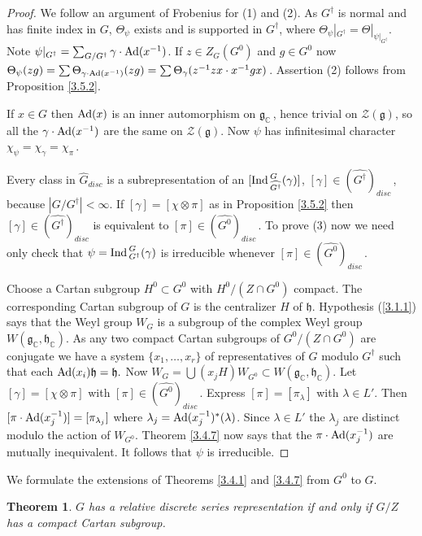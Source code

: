 \documentclass{conm-p-l}
\newtheorem{theorem}[equation]{Theorem}
\renewcommand{\gg}{\mathfrak{g}}
\def\gg{\mathfrak{g}}
\def\gh{\mathfrak{h}}
\def\Ad{{\rm Ad}}
\def\Ind{{\rm Ind\,}}
\def\C{\mathbb{C}}
\def\cZ{\mathcal{Z}}
\begin{document}
\begin{proof}
We follow an argument \cite[Lemma 4.3.3]{W1967} of Frobenius for (1) and (2).
As $G^\dagger$ is normal and has finite index in $G$, $\Theta_\psi$
exists and is supported in $G^\dagger$, where $\Theta_\psi|_{G^\dagger} =
\Theta|_{\psi|_{G^\dagger}}$.  Note $\psi|_{G^\dagger} = 
\sum_{G/G^\dagger} \gamma\cdot\Ad(x^{-1})$.  If $z \in Z_G(G^0)$ and
$g \in G^0$ now $\Theta_\psi(zg) = \sum \Theta_{\gamma\cdot\Ad(x^{-1})}(zg)
= \sum \Theta_\gamma(z^{-1}zx\cdot x^{-1}gx)$\,.  Assertion (2) follows 
from Proposition \ref{3.5.2}.

If $x \in G$ then $\Ad(x)$ is an inner automorphism on $\gg_\C$\,, hence 
trivial on $\cZ(\gg)$, so all the $\gamma\cdot\Ad(x^{-1})$ are the same
on $\cZ(\gg)$.  Now $\psi$ has infinitesimal character $\chi_\psi =
\chi_\gamma = \chi_\pi$\,.

Every class in $\widehat{G}_{disc}$ is a subrepresentation of an 
$[\Ind_{\widehat{G^\dagger}}^G(\gamma)]$, 
$[\gamma] \in (\widehat{G^\dagger})_{disc}$\,, because $|G/G^\dagger| < \infty$.
If $[\gamma] = [\chi\otimes\pi]$ as in Proposition \ref{3.5.2} then
$[\gamma] \in (\widehat{G^\dagger})_{disc}$ is equivalent to
$[\pi] \in (\widehat{G^0})_{disc}$\,.  To prove (3) now we need only
check that $\psi = \Ind_{G^\dagger}^G(\gamma)$ is irreducible whenever
$[\pi] \in (\widehat{G^0})_{disc}$\,.  

Choose a Cartan subgroup
$H^0 \subset G^0$ with $H^0/(Z\cap G^0)$ compact.  The corresponding
Cartan subgroup of $G$ is the centralizer $H$ of $\gh$.  Hypothesis
(\ref{3.1.1}) says that the Weyl group $W_G$ is a subgroup of the complex
Weyl group $W(\gg_\C,\gh_\C)$.  As any two compact Cartan subgroups of
$G^0/(Z\cap G^0)$ are conjugate we have a system $\{x_1,\dots ,x_r\}$
of representatives of $G$ modulo $G^\dagger$ such that each $\Ad(x_i)\gh = \gh.$
Now $W_G = \bigcup (x_jH)W_{G^0} \subset W(\gg_\C,\gh_\C)$.  Let $[\gamma]
= [\chi\otimes\pi]$ with $[\pi] \in (\widehat{G^0})_{disc}$\,.  Express
$[\pi] = [\pi_\lambda]$ with $\lambda \in L'$.  Then $[\pi\cdot\Ad(x_j^{-1})]
= [\pi_{\lambda_j}]$ where $\lambda_j = \Ad(x^{-1}_j)^*(\lambda)$.
Since $\lambda \in L'$ the $\lambda_j$ are distinct modulo the action of
$W_{G^0}$.  Theorem \ref{3.4.7} now says that the $\pi\cdot\Ad(x_j^{-1})$
are mutually inequivalent.  It follows that $\psi$ is irreducible.
\end{proof}

We formulate the extensions of Theorems \ref{3.4.1} and \ref{3.4.7}
from $G^0$ to $G$.
\begin{theorem}\label{3.5.8}
$G$ has a relative discrete series representation if and only if $G/Z$
has a compact Cartan subgroup.
\end{theorem}
\end{document}
